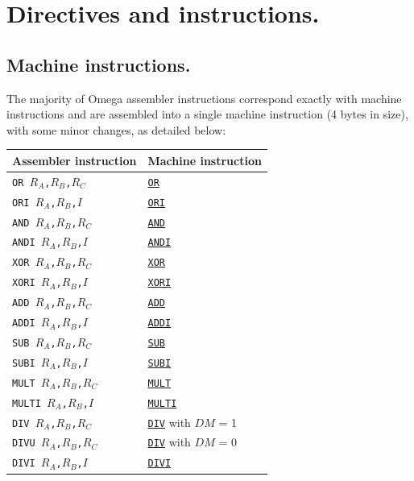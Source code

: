 \documentclass[12pt,english,twoside]{report}
\def\code{\texttt}
\newcommand\machineinst[1]{\hyperref[sec:Ins_#1]{\code{#1}}}
\begin{document}
\section{Directives and instructions.}

\subsection{Machine instructions.}

The majority of Omega assembler instructions correspond exactly with
machine instructions and are assembled into a single machine
instruction (4 bytes in size), with some minor changes, as detailed below:

  \begin{center}
    \begin{longtable}{l|l}
      \textbf{Assembler instruction} & \textbf{Machine instruction}\\
      \hline
      \code{OR $R_A$,$R_B$,$R_C$} & \machineinst{OR}\\
      \hline
      \code{ORI $R_A$,$R_B$,$I$} & \machineinst{ORI}\\
      \hline
      \code{AND $R_A$,$R_B$,$R_C$} & \machineinst{AND}\\
      \hline
      \code{ANDI $R_A$,$R_B$,$I$} & \machineinst{ANDI}\\
      \hline
      \code{XOR $R_A$,$R_B$,$R_C$} & \machineinst{XOR}\\
      \hline
      \code{XORI $R_A$,$R_B$,$I$} & \machineinst{XORI}\\
      \hline
      \code{ADD $R_A$,$R_B$,$R_C$} & \machineinst{ADD}\\
      \hline
      \code{ADDI $R_A$,$R_B$,$I$} & \machineinst{ADDI}\\
      \hline
      \code{SUB $R_A$,$R_B$,$R_C$} & \machineinst{SUB}\\
      \hline
      \code{SUBI $R_A$,$R_B$,$I$} & \machineinst{SUBI}\\
      \hline
      \code{MULT $R_A$,$R_B$,$R_C$} & \machineinst{MULT}\\
      \hline
      \code{MULTI $R_A$,$R_B$,$I$} & \machineinst{MULTI}\\
      \hline
      \code{DIV $R_A$,$R_B$,$R_C$} & \machineinst{DIV} with $DM$ = 1\\
      \hline
      \code{DIVU $R_A$,$R_B$,$R_C$} & \machineinst{DIV} with $DM$ = 0\\
      \hline
      \code{DIVI $R_A$,$R_B$,$I$} & \machineinst{DIVI}\\

\end{longtable}
\end{center}
\end{document}
